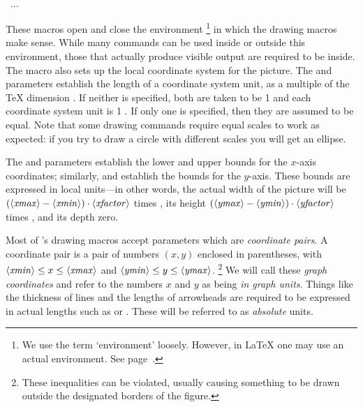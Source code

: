 \documentclass[letterpaper]{article}
\begin{document}
\begin{cd}
%
  \\
  \ $\ldots$\\
%
%
\end{cd}

These macros open and close the  environment%
    \footnote{We use the term `environment' loosely. However, in
    \LaTeX{} one may use an actual  environment. See
    page~\pageref{envusage}.}
in which the drawing macros make sense. While many \mfp{} commands can
be used inside or outside this environment, those that actually produce
visible output are required to be inside. The  macro also sets
up the local coordinate system for the picture. The  and
 parameters establish the length of a coordinate system
unit, as a multiple of the \TeX{} dimension . If neither
is specified, both are taken to be 1 and each coordinate system unit is
1 . If only one is specified, then they are assumed to be
equal. Note that some drawing commands require equal scales to work as
expected: if you try to draw a circle with different scales you will get
an ellipse.

The  and  parameters establish the lower
and upper bounds for the $x$-axis coordinates; similarly, 
and  establish the bounds for the $y$-axis. These bounds are
expressed in local units---in other words, the actual width of the
picture will be $(\langle\mbox{\rmfamily\itshape xmax\/}\rangle-\langle\mbox{\rmfamily\itshape xmin\/}\rangle)\cdot\langle\mbox{\rmfamily\itshape xfactor\/}\rangle$ times
, its height $(\langle\mbox{\rmfamily\itshape ymax\/}\rangle-\langle\mbox{\rmfamily\itshape ymin\/}\rangle)\cdot\langle\mbox{\rmfamily\itshape yfactor\/}\rangle$
times , and its depth zero.

Most of \mfp{}'s drawing macros accept parameters which are
\emph{coordinate pairs}. A coordinate pair is a pair of numbers $(x,y)$
enclosed in parentheses, with $\langle\mbox{\rmfamily\itshape xmin\/}\rangle \le x \le \langle\mbox{\rmfamily\itshape xmax\/}\rangle$ and
$\langle\mbox{\rmfamily\itshape ymin\/}\rangle \le y \le \langle\mbox{\rmfamily\itshape ymax\/}\rangle$.%
    \footnote{These inequalities can be violated, usually causing
    something to be drawn outside the designated borders of the figure.}
We will call these \emph{graph coordinates} and refer to the numbers $x$
and $y$ as being \emph{in graph units}. Things like the thickness of
lines and the lengths of arrowheads are required to be expressed in
actual lengths such as \dim{1pt} or \dim{3mm}. These will be referred to as
\emph{absolute} units.
\end{document}
